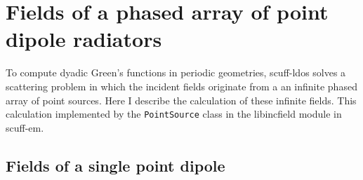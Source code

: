 \documentclass[letterpaper]{article}
\begin{document}
\appendix
\newpage 
\section{Fields of a phased array of point dipole radiators}
\label{DipoleFieldsAppendix}

To compute dyadic Green's functions in periodic geometries,
{\sc scuff-ldos} solves a scattering problem in which the
incident fields originate from a an infinite phased array
of point sources. Here I describe the calculation of these
infinite fields. This calculation implemented by the 
\texttt{PointSource} 
class in the {\sc libincfield} module in {\sc scuff-em}.

\subsection*{Fields of a single point dipole}
\end{document}
